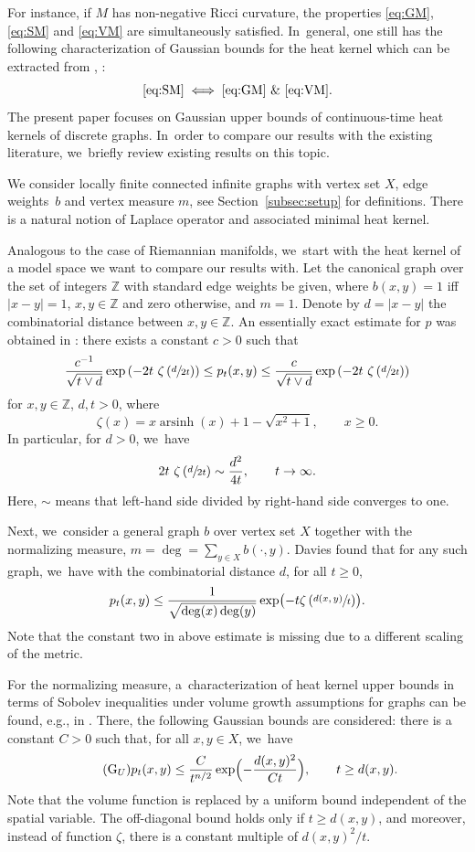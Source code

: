 \documentclass[JEP,XML,SOM,Unicode,published]{cedram}
\newcommand{\rG}{\mathrm{G}}
\theoremstyle{plain}
\theoremstyle{definition}
\newcommand{\ZZ}{\mathbb{Z}}
\DeclareMathOperator{\arsinh}{arsinh}
\begin{document}
For instance, if $M$ has non-negative Ricci curvature, the properties \eqref{eq:GM}, \eqref{eq:SM} and \eqref{eq:VM} are simultaneously satisfied. In~general, one still has
the following characterization of Gaussian bounds for the heat kernel which can be extracted from {\cite{Grigoryan-94,BakryCLS-95}}, \cf \cite{SaloffC-01}:
\[
\eqref{eq:SM} \iff \eqref{eq:GM}\ \& \ \eqref{eq:VM}.
\]
The present paper focuses on Gaussian upper bounds of continuous-time heat kernels of discrete graphs. In~order to compare our results with the existing literature, we~briefly review existing results on this topic.

We consider locally finite connected infinite graphs with vertex set $X$, edge weights~$b$ and vertex measure $m$, see Section~\ref{subsec:setup} for definitions. There is a natural notion of Laplace operator and associated minimal heat kernel.

Analogous to the case of Riemannian manifolds, we~start with the heat kernel of a model space we want to compare our results with.
Let the canonical graph over the set of integers $\ZZ$ with standard edge weights be given, where $b(x,y)=1$ iff $|x-y|=1$, $x,y\in\ZZ$ and zero otherwise, and $m=1$. Denote by $d=|x-y|$ the combinatorial distance between $x,y\in\ZZ$.
An essentially exact estimate for $p$ was obtained in \cite[Th.\,3.5]{Pang-93}: there exists a constant $c>0$ such that
\[
\frac{c^{-1}}{\sqrt {t\vee d}}\exp\left(-2t\ \zeta\left(\sfrac{d}{2t}\right)\right)\leq p_t(x,y)\leq \frac{c}{\sqrt {t\vee d}}\exp\left(-2t\ \zeta\left(\sfrac{d}{2t}\right)\right)
\]
for $x,y\in\ZZ$, $d,t>0$,
where
\[
\zeta(x)
=
x\arsinh(x)
+1-\sqrt{x^2+1},\qquad x\geq 0.
\]
In particular, for $d>0$, we~have
\[
2t\ \zeta\left(\sfrac{d}{2t}\right)\sim \frac{d^2}{4t},\qquad t\to \infty.
\]
Here, $\sim$ means that left-hand side divided by right-hand side converges to one.

Next, we~consider a general graph $b$ over vertex set $X$ together with the normalizing measure, \ie $m=\deg=\sum_{y\in X}b(\cdot, y)$. Davies \cite{Davies-93} found that for any such graph, we~have with the combinatorial distance $d$, for all $t\ge 0$,
\[
p_t(x,y)\leq \frac{1}{\sqrt{\deg(x)\deg(y)}}\exp\bigl(-t\zeta\left(\sfrac{d(x,y)}{t}\right)\bigr).
\]
Note that the constant two in above estimate is missing due to a different scaling of the metric.

For the normalizing measure, a~characterization of heat kernel upper bounds in terms of Sobolev inequalities under volume growth assumptions for graphs can be found, e.g., in \cite{Barlow-book}. There, the following Gaussian bounds are considered: there is a constant $C>0$ such that, for all $x,y\in X$, we~have
\begin{equation}\tag{$\rG_U$}\label{eq:GU}
p_t(x,y)\leq \frac{C}{t^{n/2}}\exp\Bigl(-\frac{d(x,y)^2}{Ct}\Bigr),\qquad t\geq d(x,y).
\end{equation}
Note that the volume function is replaced by a uniform bound independent of the spatial variable. The off-diagonal bound holds only if $t\geq d(x,y)$, and moreover, instead of function $\zeta$, there is a constant multiple of $d(x,y)^2/t$.
\end{document}
